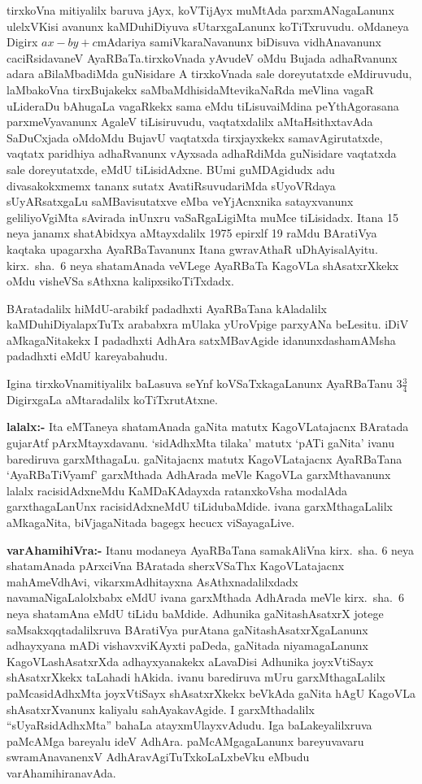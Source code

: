 tirxkoVna mitiyalilx baruva jAyx, koVTijAyx muMtAda parxmANagaLanunx \-ulelxVKisi avanunx kaMDuhiDiyuva sUtarxgaLanunx koTiTxruvudu. oMdaneya Digirx $ax-by+c$\break mAdariya samiVkaraNavanunx biDisuva vidhAnavanunx caciRsidavaneV AyaRBaTa.\break tirxkoVnada yAvudeV oMdu Bujada adhaRvanunx adara aBilaMbadiMda guNisidare A tirxkoVnada sale doreyutatxde eMdiruvudu, laMbakoVna tirxBujakekx saMbaMdhisidaMte\break vikaNaRda  meVlina vagaR uLideraDu bAhugaLa vagaRkekx sama eMdu tiLisuva\break iMdina peYthAgorasana parxmeVyavanunx AgaleV tiLisiruvudu, vaqtatxdalilx aMtaHsithxtavAda SaDuCxjada oMdoMdu BujavU vaqtatxda tirxjayxkekx samavAgirutatxde, vaqtatx paridhiya adhaR\-vanunx vAyxsada adhaRdiMda guNisidare vaqtatxda sale doreyutatxde, eMdU tiLisidAdxne. BUmi guMDAgidudx adu divasakokxmemx tananx sutatx AvatiRsuvudariMda sUyoVR\-daya sUyARsatxgaLu saMBavisutatxve eMba veYjAcnxnika satayxvanunx geliliyoVgiMta sAvirada inUnxru vaSaRgaLigiMta muMce tiLisidadx. Itana {\rm 15} neya janamx shatAbidxya aMtayxdalilx {\rm 1975} epirxlf {\rm 19} raMdu BAratiVya kaqtaka upagarxha AyaRBaTavanunx Itana gwravAthaR uDhAyisalAyitu. kirx.~sha.~{\rm 6} neya shatamAnada veVLege AyaRBaTa KagoVLa shAsatxrXkekx oMdu visheVSa sAthxna kalipxsikoTiTxdadx.

BAratadalilx hiMdU-arabikf padadhxti AyaRBaTana kAladalilx kaMDuhiDiyalapxTuTx arababxra mUlaka yUroVpige parxyANa beLesitu. iDiV aMkagaNitakekx I padadhxti AdhAra satxMBavAgide idanunxdashamAMsha padadhxti eMdU kareyabahudu.

Igina tirxkoVnamitiyalilx baLasuva seYnf koVSaTxkagaLanunx AyaRBaTanu $3\frac{3}{4}$ \break DigirxgaLa aMtaradalilx koTiTxrutAtxne.

\textbf{lalalx:-} Ita eMTaneya shatamAnada gaNita matutx KagoVLatajacnx BAratada guja\-rAtf pArxMtayxdavanu. `sidAdhxMta tilaka' matutx `pATi gaNita' ivanu barediruva garxMthagaLu. gaNitajacnx matutx KagoVLatajacnx AyaRBaTana `AyaRBaTiVyamf' garxMthada AdhA\-rada meVle KagoVLa garxMthavanunx lalalx racisidAdxneMdu KaMDaKAdayxda ratanxkoVsha modalAda garxthagaLanUnx racisidAdxneMdU tiLidubaMdide. ivana garxMthagaLalilx aMkagaNita, biVja\-gaNitada bagegx hecucx viSayagaLive.

\textbf{varAhamihiVra:-} Itanu modaneya AyaRBaTana samakAliVna kirx.~sha. {\rm 6} neya shatamAnada pArxciVna BAratada sherxVSaThx KagoVLatajacnx mahAmeVdhAvi, vikarxmAdhitayxna AsAthxnadalilxdadx navamaNigaLalolxbabx eMdU ivana garxMthada AdhArada meVle kirx.~sha.~{\rm 6} neya shatamAna eMdU tiLidu baMdide. Adhunika gaNitashAsatxrX jotege saMsakxqqtadalilxruva BAra\-tiVya purAtana gaNitashAsatxrXgaLanunx adhayxyana mADi vishavxviKAyxti paDeda, gaNitada niyama\-gaLanunx KagoVLashAsatxrXda adhayxyanakekx aLavaDisi Adhunika joyxVtiSayx shAsatxrXkekx taLahadi hAkida. ivanu barediruva mUru garxMthagaLalilx paMcasidAdhxMta joyxVtiSayx shAsatxrXkekx beVkAda gaNita hAgU KagoVLa shAsatxrXvanunx kaliyalu sahAyakavAgide. I garxMthadalilx ``sUyaRsidAdhxMta'' bahaLa atayxmUlayxvAdudu. Iga baLakeyalilxruva paMcAMga bareyalu ideV AdhAra. paMcAMgagaLanunx bareyuvavaru swramAnavanenxV AdhAravAgiTuTxkoLaLxbeVku eMbudu varAhamihiranavAda.

